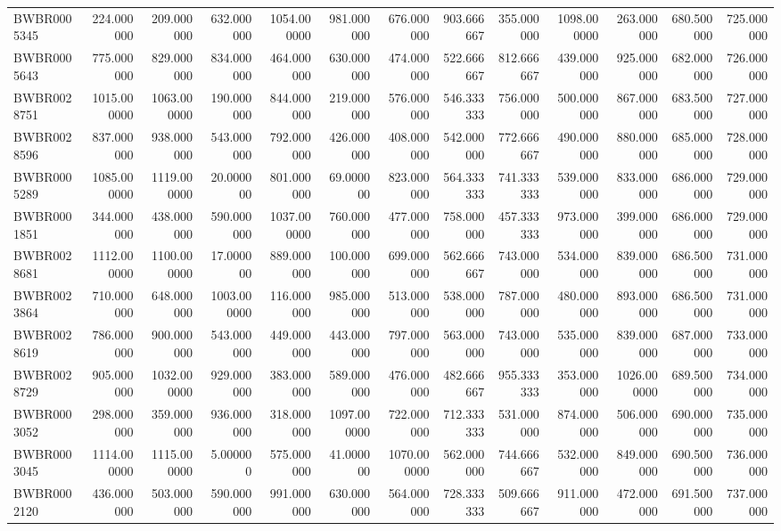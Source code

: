 \begin{longtable}{lrrrrrrrrrrrr}
BWBR0005345 & 224.000000 & 209.000000 & 632.000000 & 1054.000000 & 981.000000 & 676.000000 & 903.666667 & 355.000000 & 1098.000000 & 263.000000 & 680.500000 & 725.000000 \\
BWBR0005643 & 775.000000 & 829.000000 & 834.000000 & 464.000000 & 630.000000 & 474.000000 & 522.666667 & 812.666667 & 439.000000 & 925.000000 & 682.000000 & 726.000000 \\
BWBR0028751 & 1015.000000 & 1063.000000 & 190.000000 & 844.000000 & 219.000000 & 576.000000 & 546.333333 & 756.000000 & 500.000000 & 867.000000 & 683.500000 & 727.000000 \\
BWBR0028596 & 837.000000 & 938.000000 & 543.000000 & 792.000000 & 426.000000 & 408.000000 & 542.000000 & 772.666667 & 490.000000 & 880.000000 & 685.000000 & 728.000000 \\
BWBR0005289 & 1085.000000 & 1119.000000 & 20.000000 & 801.000000 & 69.000000 & 823.000000 & 564.333333 & 741.333333 & 539.000000 & 833.000000 & 686.000000 & 729.000000 \\
BWBR0001851 & 344.000000 & 438.000000 & 590.000000 & 1037.000000 & 760.000000 & 477.000000 & 758.000000 & 457.333333 & 973.000000 & 399.000000 & 686.000000 & 729.000000 \\
BWBR0028681 & 1112.000000 & 1100.000000 & 17.000000 & 889.000000 & 100.000000 & 699.000000 & 562.666667 & 743.000000 & 534.000000 & 839.000000 & 686.500000 & 731.000000 \\
BWBR0023864 & 710.000000 & 648.000000 & 1003.000000 & 116.000000 & 985.000000 & 513.000000 & 538.000000 & 787.000000 & 480.000000 & 893.000000 & 686.500000 & 731.000000 \\
BWBR0028619 & 786.000000 & 900.000000 & 543.000000 & 449.000000 & 443.000000 & 797.000000 & 563.000000 & 743.000000 & 535.000000 & 839.000000 & 687.000000 & 733.000000 \\
BWBR0028729 & 905.000000 & 1032.000000 & 929.000000 & 383.000000 & 589.000000 & 476.000000 & 482.666667 & 955.333333 & 353.000000 & 1026.000000 & 689.500000 & 734.000000 \\
BWBR0003052 & 298.000000 & 359.000000 & 936.000000 & 318.000000 & 1097.000000 & 722.000000 & 712.333333 & 531.000000 & 874.000000 & 506.000000 & 690.000000 & 735.000000 \\
BWBR0003045 & 1114.000000 & 1115.000000 & 5.000000 & 575.000000 & 41.000000 & 1070.000000 & 562.000000 & 744.666667 & 532.000000 & 849.000000 & 690.500000 & 736.000000 \\
BWBR0002120 & 436.000000 & 503.000000 & 590.000000 & 991.000000 & 630.000000 & 564.000000 & 728.333333 & 509.666667 & 911.000000 & 472.000000 & 691.500000 & 737.000000 \\

\end{longtable}
